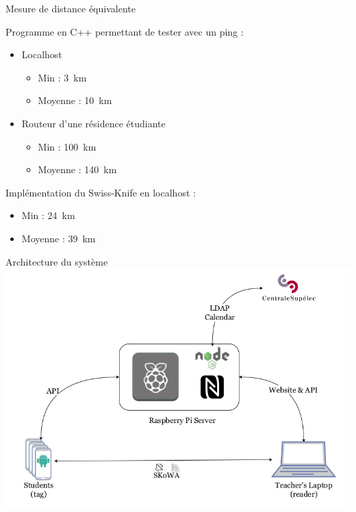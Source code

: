 \documentclass[aspectratio=169]{beamer}
\begin{document}
\begin{frame}{Mesure de distance équivalente}

  Programme en C++ permettant de tester avec un ping :
  \begin{itemize}
    \item Localhost
          \begin{itemize}
            \item Min : \SI{3}{\kilo\meter}
            \item Moyenne : \SI{10}{\kilo\meter}
          \end{itemize}
    \item Routeur d'une résidence étudiante
          \begin{itemize}
            \item Min : \SI{100}{\kilo\meter}
            \item Moyenne : \SI{140}{\kilo\meter}
          \end{itemize}
  \end{itemize}

  \bigskip

  Implémentation du Swiss-Knife en localhost :
  \begin{itemize}
    \item Min : \SI{24}{\kilo\meter}
    \item Moyenne : \SI{39}{\kilo\meter}
  \end{itemize}

\end{frame}

\begin{frame}{Architecture du système}
  \centering
  \includegraphics[height=0.8\textheight]{../assets/architecture.png}
\end{frame}
\end{document}
